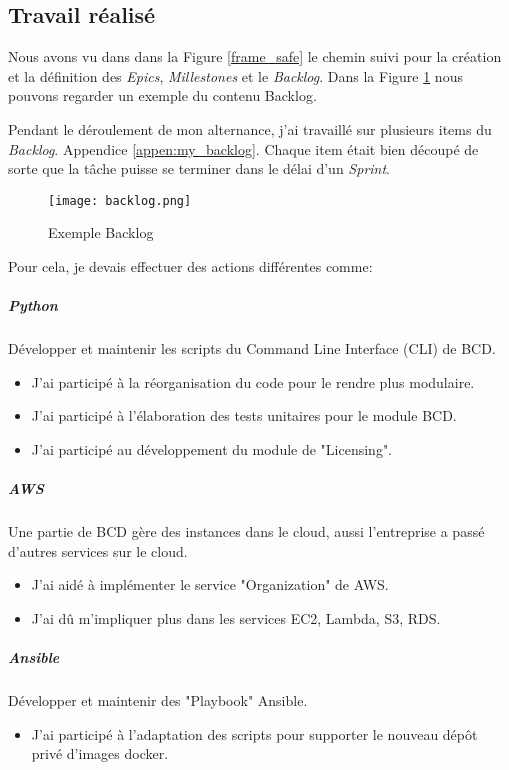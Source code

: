 \subsection{Travail réalisé}\label{sec:work_done}
Nous avons vu dans dans la Figure \ref{frame_safe} le chemin suivi pour la création et la définition des \textit{Epics}, \textit{Millestones} et le \textit{Backlog}. Dans la Figure \ref{fig:backlog} nous pouvons regarder un exemple du contenu Backlog.

Pendant le déroulement de mon alternance, j'ai travaillé sur plusieurs items du \textit{Backlog}. Appendice  \ref{appen:my_backlog}. Chaque item était bien découpé de sorte que la tâche puisse se terminer dans le délai d'un \textit{Sprint}.

\begin{figure}[!ht]
\centering
\texttt{[image: backlog.png]}
\caption{Exemple Backlog}
\label{fig:backlog}
\end{figure}

Pour cela, je devais effectuer des actions différentes comme:

\subparagraph{Python} Développer et maintenir les scripts du Command Line Interface (CLI) de BCD.
\begin{itemize}
  \item J'ai participé à la réorganisation du code pour le rendre plus modulaire.
  \item J'ai participé à l'élaboration des tests unitaires pour le module BCD.
  \item J'ai participé au développement du module de "Licensing".
\end{itemize}

\subparagraph{AWS} Une partie de BCD gère des instances dans le cloud, aussi l'entreprise a passé d'autres services sur le cloud.
\begin{itemize}
  \item J'ai aidé à implémenter le service "Organization" de AWS.
  \item J'ai dû m'impliquer plus dans les services EC2, Lambda, S3, RDS.
\end{itemize}

\subparagraph{Ansible} Développer et maintenir des "Playbook" Ansible.
\begin{itemize}
  \item J'ai participé à l'adaptation des scripts pour supporter le nouveau dépôt privé d'images docker.
\end{itemize}

